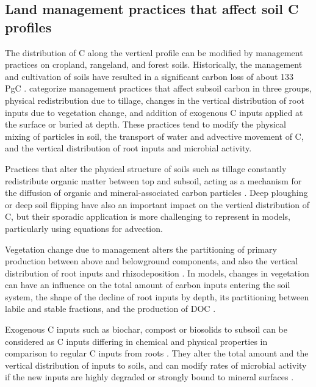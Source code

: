 \documentclass[11pt, oneside, a4paper]{article}   	%
\begin{document}
\subsection{Land management practices that affect soil C profiles}
The distribution of C along the vertical profile can be modified by management practices on cropland, rangeland, and forest soils. 
Historically, the management and cultivation of soils have resulted in a significant carbon loss of about 133 PgC \citep{Sanderman2017}. \citet{HicksPries2023} categorize management practices that affect subsoil carbon in three groups, physical redistribution due to tillage, changes in the vertical distribution of root inputs due to vegetation change, and addition of exogenous C inputs applied at the surface or buried at depth. These practices tend to modify the physical mixing of particles in soil, the transport of water and advective movement of C, and the vertical distribution of root inputs and microbial activity.

Practices that alter the physical structure of soils such as tillage constantly redistribute organic matter between top and subsoil, acting as a mechanism for the diffusion of organic and mineral-associated carbon particles \citep{Keyvanshokouhi2019, Mary2020, Button2022}. Deep ploughing \citep{Alcantara2016, Wang2023JCP} or deep soil flipping \citep{Schiedung2019} have also an important impact on the vertical distribution of C, but their sporadic application is more challenging to represent in models, particularly using equations for advection. 

Vegetation change due to management alters the partitioning of primary production between above and belowground components, and also the vertical distribution of root inputs and rhizodeposition \citep{Rumpel2011}. In models, changes in vegetation can have an influence on the total amount of carbon inputs entering the soil system, the shape of the decline of root inputs by depth, its partitioning between labile and stable fractions, and the production of DOC \citep{Ota2013}. 

Exogenous C inputs such as biochar, compost or biosolids to subsoil can be considered as C inputs differing in chemical and physical properties in comparison to regular C inputs from roots \citep{Paustian2016}. They alter the total amount and the vertical distribution of inputs to soils, and can modify rates of microbial activity if the new inputs are highly degraded or strongly bound to mineral surfaces \citep{Rumpel2012, Button2022}. 
\end{document}
